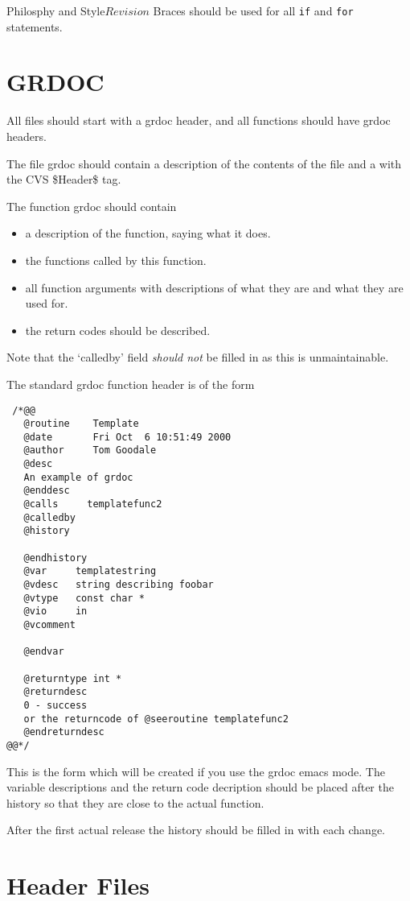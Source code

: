 \begin{cactuspart}{1}{Philosphy and Style}{}{$Revision$}
Braces should be used for all {\tt if} and {\tt for} statements.

\section{GRDOC}

All files should start with a grdoc header, and all functions
should have grdoc headers.

The file grdoc should contain a description of the contents of the file
and a \@version with the CVS \$Header\$ tag.

The function grdoc should contain

\begin{itemize}
\item
a description of the function, saying what it does.
\item
the functions called by this function.
\item
all function arguments with descriptions
of what they are and what they are used for.
\item
the return codes should be described.
\end{itemize}

Note that the `calledby' field {\em should not} be filled in as
this is unmaintainable.

The standard grdoc function header is of the form

\begin{verbatim}
 /*@@
   @routine    Template
   @date       Fri Oct  6 10:51:49 2000
   @author     Tom Goodale
   @desc
   An example of grdoc
   @enddesc
   @calls     templatefunc2
   @calledby
   @history

   @endhistory
   @var     templatestring
   @vdesc   string describing foobar
   @vtype   const char *
   @vio     in
   @vcomment

   @endvar

   @returntype int *
   @returndesc
   0 - success
   or the returncode of @seeroutine templatefunc2
   @endreturndesc
@@*/
\end{verbatim}

This is the form which will be created if you use the grdoc emacs mode.  
The variable descriptions and the return code decription should be placed
after the history so that they are close to the actual function.

After the first actual release the history should be filled
in with each change.

\section{Header Files}


\end{cactuspart}
